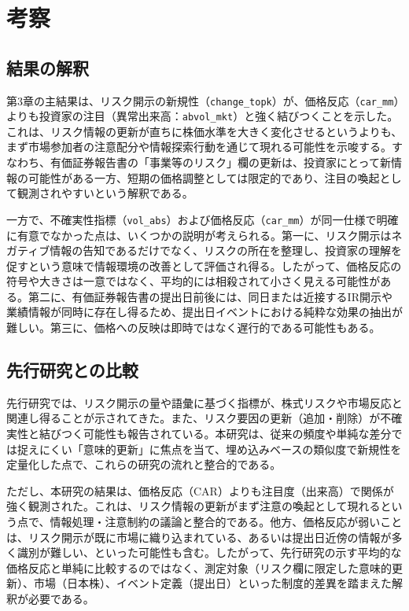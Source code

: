 \chapter{考察}

\section{結果の解釈}
第3章の主結果は、リスク開示の新規性（\texttt{change\_topk}）が、価格反応（\texttt{car\_mm}）よりも投資家の注目（異常出来高：\texttt{abvol\_mkt}）と強く結びつくことを示した。これは、リスク情報の更新が直ちに株価水準を大きく変化させるというよりも、まず市場参加者の注意配分や情報探索行動を通じて現れる可能性を示唆する。すなわち、有価証券報告書の「事業等のリスク」欄の更新は、投資家にとって新情報の可能性がある一方、短期の価格調整としては限定的であり、注目の喚起として観測されやすいという解釈である。

一方で、不確実性指標（\texttt{vol\_abs}）および価格反応（\texttt{car\_mm}）が同一仕様で明確に有意でなかった点は、いくつかの説明が考えられる。第一に、リスク開示はネガティブ情報の告知であるだけでなく、リスクの所在を整理し、投資家の理解を促すという意味で情報環境の改善として評価され得る。したがって、価格反応の符号や大きさは一意ではなく、平均的には相殺されて小さく見える可能性がある。第二に、有価証券報告書の提出日前後には、同日または近接するIR開示や業績情報が同時に存在し得るため、提出日イベントにおける純粋な効果の抽出が難しい。第三に、価格への反映は即時ではなく遅行的である可能性もある。

\section{先行研究との比較}
先行研究では、リスク開示の量や語彙に基づく指標が、株式リスクや市場反応と関連し得ることが示されてきた\cite{Campbell2014}。また、リスク要因の更新（追加・削除）が不確実性と結びつく可能性も報告されている\cite{Lyle2023}。本研究は、従来の頻度や単純な差分では捉えにくい「意味的更新」に焦点を当て、埋め込みベースの類似度で新規性を定量化した点で、これらの研究の流れと整合的である。

ただし、本研究の結果は、価格反応（CAR）よりも注目度（出来高）で関係が強く観測された。これは、リスク情報の更新がまず注意の喚起として現れるという点で、情報処理・注意制約の議論と整合的である。他方、価格反応が弱いことは、リスク開示が既に市場に織り込まれている、あるいは提出日近傍の情報が多く識別が難しい、といった可能性も含む。したがって、先行研究の示す平均的な価格反応と単純に比較するのではなく、測定対象（リスク欄に限定した意味的更新）、市場（日本株）、イベント定義（提出日）といった制度的差異を踏まえた解釈が必要である。

